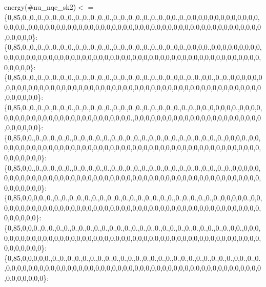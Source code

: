 energy(\#nu\+\_\+nqe\+\_\+sk2)$<$  = \{0,85,0.,0.,0.,0.,0.,0.,0.,0.,0.,0.,0.,0.,0.,0.,0.,0.,0.,0.,0.,0,0.,0.,0,0,0,0,0,0,0,0,0,0,0,0,0,0,0,0,0.,0,0,0,0,0,0,0,0,0,0,0,0,0,0,0,0,0,0,0,0,0,0,0,0,0,0,0,0,0,0,0,0,0,0,0,0,0,0,0,0,0,0,0,0,0,0,0\}\+: \{0,85,0.,0.,0.,0.,0.,0.,0.,0.,0.,0.,0.,0.,0.,0.,0.,0.,0.,0.,0.,0.,0,0.,0,0,0,0.,0,0,0,0,0,0,0,0,0,0,0,0,0,0,0,0,0,0,0,0,0,0,0,0,0,0,0,0,0,0,0,0,0,0,0,0,0,0,0,0,0,0,0,0,0,0,0,0,0,0,0,0,0,0,0,0,0,0,0,0\}\+: \{0,85,0.,0.,0.,0.,0.,0.,0.,0.,0.,0.,0.,0.,0.,0.,0.,0.,0.,0.,0.,0.,0,0.,0.,0.,0,0.,0.,0.,0,0,0,0,0,0,0,0,0,0,0,0,0,0,0,0,0,0,0,0,0,0,0,0,0,0,0,0,0,0,0,0,0,0,0,0,0,0,0,0,0,0,0,0,0,0,0,0,0,0,0,0,0,0,0,0,0,0\}\+: \{0,85,0.,0.,0.,0.,0.,0.,0.,0.,0.,0.,0.,0.,0.,0.,0.,0.,0.,0.,0.,0.,0.,0.,0.,0,0.,0,0,0,0,0.,0,0,0,0,0,0,0,0,0,0,0,0,0,0,0,0,0,0,0,0,0,0,0,0,0,0,0.,0,0,0,0,0,0,0,0,0,0,0,0,0,0,0,0,0,0,0,0,0,0,0,0,0,0,0,0,0\}\+: \{0,85,0,0.,0.,0.,0.,0.,0.,0.,0.,0.,0.,0.,0.,0.,0.,0.,0.,0.,0.,0.,0.,0.,0.,0.,0.,0.,0.,0,0,0,0.,0,0,0,0,0,0,0,0,0,0,0,0,0,0,0,0,0,0,0,0,0,0,0,0,0,0,0,0,0,0,0,0,0,0,0,0,0,0,0,0,0,0,0,0,0,0,0,0,0,0,0,0,0,0,0\}\+: \{0,85,0,0.,0.,0.,0.,0.,0.,0.,0.,0.,0.,0.,0.,0.,0.,0.,0.,0.,0.,0.,0.,0.,0.,0.,0.,0.,0.,0.,0,0,0,0,0,0,0,0,0,0,0,0,0,0,0,0,0,0,0,0,0,0,0,0,0,0,0,0,0,0,0,0,0,0,0,0,0,0,0,0,0,0,0,0,0,0,0,0,0,0,0,0,0,0,0,0,0,0\}\+: \{0,85,0,0,0,0.,0.,0.,0.,0.,0.,0.,0.,0.,0.,0.,0.,0.,0.,0.,0.,0.,0.,0.,0.,0.,0.,0.,0.,0,0,0,0,0.,0,0,0,0,0,0,0,0,0,0,0,0,0,0,0,0,0,0,0,0,0,0,0,0,0,0,0,0,0,0,0,0,0,0,0,0,0,0,0,0,0,0,0,0,0,0,0,0,0,0,0,0,0,0\}\+: \{0,85,0,0,0.,0.,0.,0.,0.,0.,0.,0.,0.,0.,0.,0.,0.,0.,0.,0.,0.,0.,0.,0.,0.,0.,0.,0.,0.,0.,0,0.,0,0,0,0,0,0,0,0,0,0,0,0,0,0,0,0,0,0,0,0,0,0,0,0,0,0,0,0,0,0,0,0,0,0,0,0,0,0,0,0,0,0,0,0,0,0,0,0,0,0,0,0,0,0,0,0\}\+: \{0,85,0,0,0,0,0.,0.,0.,0.,0.,0.,0.,0.,0.,0.,0.,0.,0.,0.,0.,0.,0.,0.,0.,0.,0.,0.,0.,0.,0.,0,0.,0.,0.,0,0,0,0,0,0,0,0,0,0,0,0,0,0,0,0,0,0,0,0,0,0,0,0,0,0,0,0,0,0,0,0,0,0,0,0,0,0,0,0,0,0,0,0,0,0,0,0,0,0,0,0,0\}\+: 